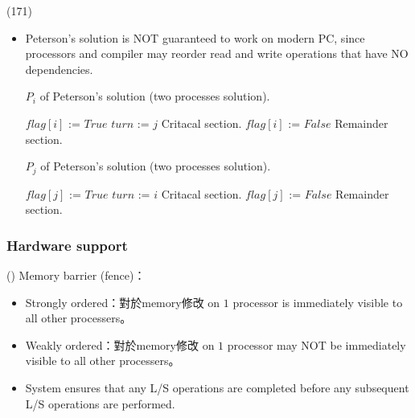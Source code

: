 \begin{theorem}{(171)}
\begin{itemize}
\begin{itemize}
            \item Peterson's solution is NOT guaranteed to work on modern PC, since processors and compiler may reorder read and write operations that have NO dependencies.
            \begin{algorithm}[H]
                \caption{$P_i$ of Peterson's solution (two processes solution).}
                \begin{algorithmic}[1]
                        \Repeat 
                            \State $flag[i]$ := $True$
                            \State $turn$ := $j$
                            \EndWhile
                            \State Critacal section.
                            \State $flag[i]$ := $False$
                            \State Remainder section.
                    \EndFunction
                \end{algorithmic}
            \end{algorithm}
            \begin{algorithm}[H]
                \caption{$P_j$ of Peterson's solution (two processes solution).}
                \begin{algorithmic}[1]
                        \Repeat 
                            \State $flag[j]$ := $True$
                            \State $turn$ := $i$
                            \EndWhile
                            \State Critacal section.
                            \State $flag[j]$ := $False$
                            \State Remainder section.
                    \EndFunction
                \end{algorithmic}
            \end{algorithm}
        \end{itemize}
    \end{itemize}
\end{theorem}

\subsubsection{Hardware support}

\begin{theorem}{()} Memory barrier (fence)：\begin{itemize}
        \item Strongly ordered：對於memory修改 on $1$ processor is immediately visible to all other processers。
        \item Weakly ordered：對於memory修改 on $1$ processor may NOT be immediately visible to all other processers。
        \item System ensures that any L/S operations are completed before any subsequent L/S operations are performed.
    \end{itemize}
\end{theorem}

